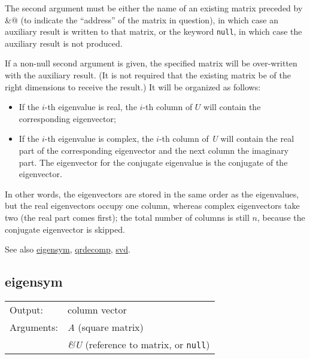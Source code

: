 	  The second argument must be either the name of an existing
	  matrix preceded by \verb@&@ (to indicate the
	  ``address'' of the matrix in question), in which case
	  an auxiliary result is written to that matrix, or the keyword
	  \texttt{null}, in which case the auxiliary result is not
	  produced.

	  If a non-null second argument is given, the specified matrix
	  will be over-written with the auxiliary result.  (It is not
	  required that the existing matrix be of the right dimensions to
	  receive the result.) It will be organized as follows:

\begin{itemize}
\item 
	      If the \ensuremath{i}-th eigenvalue is real, the
	      \ensuremath{i}-th column of \ensuremath{U} will contain the
	      corresponding eigenvector;

\item 
	      If the \ensuremath{i}-th eigenvalue is complex, the
	      \ensuremath{i}-th column of \textsl{U} will
	      contain the real part of the corresponding eigenvector and
	      the next column the imaginary part. The eigenvector for the
	      conjugate eigenvalue is the conjugate of the eigenvector.

\end{itemize}

	  In other words, the eigenvectors are stored in the same order as
	  the eigenvalues, but the real eigenvectors occupy one column,
	  whereas complex eigenvectors take two (the real part comes
	  first); the total number of columns is still \ensuremath{n},
	  because the conjugate eigenvector is skipped.

	  See also \hyperlink{func-eigensym}{eigensym}, \hyperlink{func-qrdecomp}{qrdecomp}, \hyperlink{func-svd}{svd}.

\subsection{eigensym}
\hypertarget{func-eigensym}{}

\begin{tabular}{ll}
Output:     & column vector\\
Arguments:  & \textsl{A} (square matrix)\\
           & \textsl{\&U} (reference to matrix, or \texttt{null})\\
\end{tabular}

